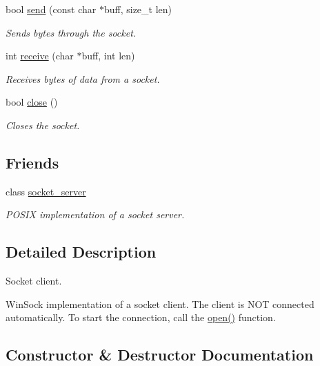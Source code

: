 \begin{DoxyCompactItemize}
bool \hyperlink{classcpen333_1_1process_1_1windows_1_1socket__client_aa365c3943cf245092dba651034288dfd}{send} (const char $\ast$buff, size\+\_\+t len)
\begin{DoxyCompactList}\small\item\em Sends bytes through the socket. \end{DoxyCompactList}\item 
int \hyperlink{classcpen333_1_1process_1_1windows_1_1socket__client_acfe69fa942e33234b10dd926aac3b78c}{receive} (char $\ast$buff, int len)
\begin{DoxyCompactList}\small\item\em Receives bytes of data from a socket. \end{DoxyCompactList}\item 
bool \hyperlink{classcpen333_1_1process_1_1windows_1_1socket__client_a59c76ee5772174b920dfcd43bdf8e2ee}{close} ()
\begin{DoxyCompactList}\small\item\em Closes the socket. \end{DoxyCompactList}\end{DoxyCompactItemize}
\subsection*{Friends}
\begin{DoxyCompactItemize}
\item 
class \hyperlink{classcpen333_1_1process_1_1windows_1_1socket__client_aba37c0ea463da9263b0712d3b3389066}{socket\+\_\+server}
\begin{DoxyCompactList}\small\item\em P\+O\+S\+IX implementation of a socket server. \end{DoxyCompactList}\end{DoxyCompactItemize}


\subsection{Detailed Description}
Socket client. 

Win\+Sock implementation of a socket client. The client is N\+OT connected automatically. To start the connection, call the \hyperlink{classcpen333_1_1process_1_1windows_1_1socket__client_a8cddf32b50ea156505f17e3a69d2a0d9}{open()} function. 

\subsection{Constructor \& Destructor Documentation}
\mbox{\label{classcpen333_1_1process_1_1windows_1_1socket__client_a10222f217adb7ad265d973f252c5d528}} 
